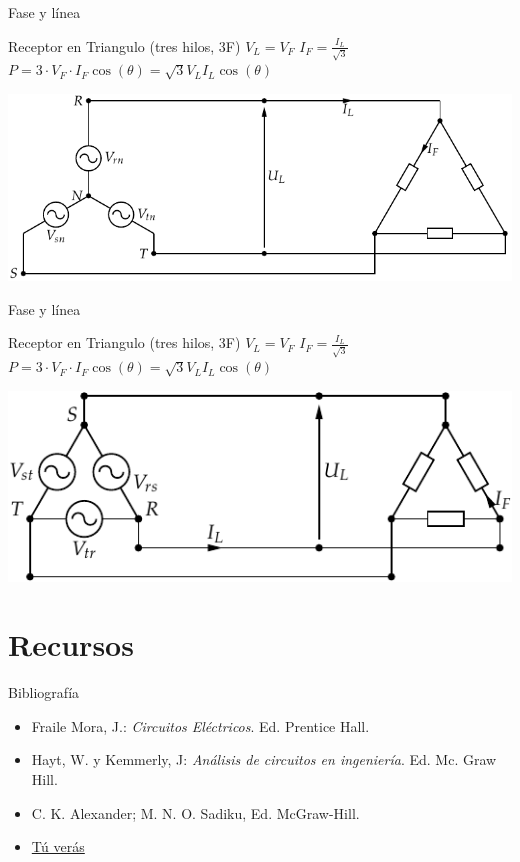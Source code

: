 \documentclass[xcolor={usenames,svgnames,dvipsnames}]{beamer}
\begin{document}
\begin{frame}[label={sec:org37f5340}]{Fase y línea}
\begin{block}{Receptor en Triangulo (tres hilos, 3F)}
\(V_{L}=V_{F}\) \(I_{F}=\frac{I_{L}}{\sqrt{3}}\)
\(P=3\cdot V_{F}\cdot I_{F}\cos(\theta)=\sqrt{3}V_{L}I_{L}\cos(\theta)\)
\begin{center}
\includegraphics[width=.9\linewidth]{../figs/RedTrifasicaEstrella_CargaTriangulo.pdf}
\end{center}
\end{block}
\end{frame}

\begin{frame}[label={sec:org712e125}]{Fase y línea}
\begin{block}{Receptor en Triangulo (tres hilos, 3F)}
\(V_{L}=V_{F}\) \(I_{F}=\frac{I_{L}}{\sqrt{3}}\)
\(P=3\cdot V_{F}\cdot I_{F}\cos(\theta)=\sqrt{3}V_{L}I_{L}\cos(\theta)\)
\begin{center}
\includegraphics[width=.9\linewidth]{../figs/RedTrifasicaTriangulo.pdf}
\end{center}
\end{block}
\end{frame}


\section{Recursos}
\label{sec:orgf665bd4}

\begin{frame}[label={sec:org2ac7816}]{Bibliografía}
\begin{itemize}
\item \alert{Fraile Mora, J.}: \emph{Circuitos Eléctricos}. Ed. Prentice Hall.

\item \alert{Hayt, W. y Kemmerly, J}: \emph{Análisis de circuitos en ingeniería}. Ed.
Mc. Graw Hill.

\item \alert{C. K. Alexander; M. N. O. Sadiku}, Ed. McGraw-Hill.

\item \href{http://tuveras.com/index.html}{Tú verás}
\end{itemize}
\end{frame}
\end{document}
